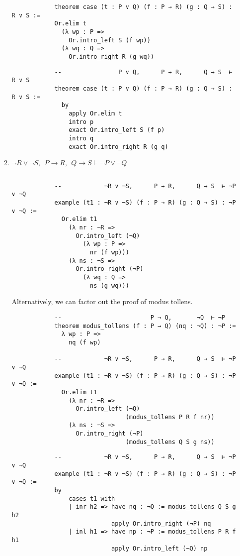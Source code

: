 \documentclass[11pt]{report}
\begin{document}
\begin{enumerate}
\begin{enumerate}
		\begin{lstlisting}
			theorem case (t : P ∨ Q) (f : P → R) (g : Q → S) : R ∨ S :=
			Or.elim t
			  (λ wp : P =>
				Or.intro_left S (f wp))
			  (λ wq : Q =>
				Or.intro_right R (g wq))
		\end{lstlisting}
		
		\begin{lstlisting}
			--                P ∨ Q,      P → R,      Q → S  ⊢ R ∨ S
			theorem case (t : P ∨ Q) (f : P → R) (g : Q → S) : R ∨ S :=
			  by
				apply Or.elim t
				intro p
				exact Or.intro_left S (f p)
				intro q
				exact Or.intro_right R (g q)
		\end{lstlisting}
		
		\newpage
		\item $\neg R \lor \neg  S, \ \ P \to  R,\ \  Q \to  S \vdash  \neg P\lor \neg  Q$
		
		\begin{lstlisting}

			--            ¬R ∨ ¬S,      P → R,      Q → S  ⊢ ¬P ∨ ¬Q
			example (t1 : ¬R ∨ ¬S) (f : P → R) (g : Q → S) : ¬P ∨ ¬Q :=
			  Or.elim t1
				(λ nr : ¬R =>
				  Or.intro_left (¬Q)
					(λ wp : P =>
					  nr (f wp)))
				(λ ns : ¬S =>
				  Or.intro_right (¬P)
					(λ wq : Q =>
					  ns (g wq)))
		\end{lstlisting}

		Alternatively, we can factor out the proof of modus tollens. 

		\begin{lstlisting}
			--                         P → Q,       ¬Q  ⊢ ¬P
			theorem modus_tollens (f : P → Q) (nq : ¬Q) : ¬P :=
			  λ wp : P =>
				nq (f wp)
			
			--            ¬R ∨ ¬S,      P → R,      Q → S  ⊢ ¬P ∨ ¬Q
			example (t1 : ¬R ∨ ¬S) (f : P → R) (g : Q → S) : ¬P ∨ ¬Q :=
			  Or.elim t1
				(λ nr : ¬R =>
				  Or.intro_left (¬Q)
								(modus_tollens P R f nr))
				(λ ns : ¬S =>
				  Or.intro_right (¬P)
								(modus_tollens Q S g ns))
		\end{lstlisting}
		
		\begin{lstlisting}
			--            ¬R ∨ ¬S,      P → R,      Q → S  ⊢ ¬P ∨ ¬Q
			example (t1 : ¬R ∨ ¬S) (f : P → R) (g : Q → S) : ¬P ∨ ¬Q :=
			by
				cases t1 with
				| inr h2 => have nq : ¬Q := modus_tollens Q S g h2
							apply Or.intro_right (¬P) nq
				| inl h1 => have np : ¬P := modus_tollens P R f h1
							apply Or.intro_left (¬Q) np
		\end{lstlisting}
		

\end{enumerate}
\end{enumerate}
\end{document}
